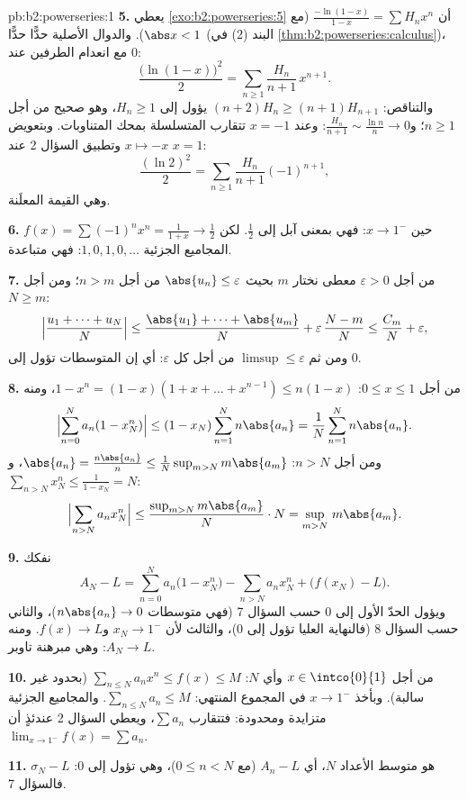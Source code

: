 \begin{solution}{pb:b2:powerseries:1}
\textbf{5.} يعطي \cref{exo:b2:powerseries:5} أن
$\frac{-\ln(1-x)}{1-x} = \sum H_nx^n$ (مع $\abs x < 1$).
والدوال الأصلية حدًّا حدًّا
(البند (2) في \cref{thm:b2:powerseries:calculus})، مع انعدام الطرفين
عند $0$:
\[
\frac{\bigl(\ln(1-x)\bigr)^2}{2}
= \sum_{n\geq1}\frac{H_n}{n+1}\,x^{n+1} .
\]
والتناقص: $(n+2)H_n \geq (n+1)H_{n+1}$ يؤول إلى $H_n \geq
1$، وهو صحيح من أجل $n \geq 1$؛ و$\frac{H_n}{n+1} \sim \frac{\ln
n}{n} \to 0$: وعند $x = -1$ تتقارب المتسلسلة بمحك
المتناوبات. وبتعويض $x \mapsto -x$ وتطبيق
السؤال 2 عند $x = 1$:
\[
\frac{(\ln 2)^2}{2}
= \sum_{n\geq1}\frac{H_n}{n+1}(-1)^{n+1},
\]
وهي القيمة المعلَنة.

\textbf{6.} $f(x) = \sum(-1)^nx^n = \frac{1}{1+x} \to \frac12$
حين $x \to 1^-$: فهي  بمعنى آبل إلى $\frac12$. لكن المجاميع
الجزئية $1, 0, 1, 0, \dots$: فهي متباعدة.

\textbf{7.} من أجل $\varepsilon > 0$ معطى نختار $m$ بحيث $\abs{u_n}
\leq \varepsilon$ من أجل $n > m$؛ ومن أجل $N \geq m$:
\[
\Bigl|\frac{u_1 + \dots + u_N}{N}\Bigr|
\leq \frac{\abs{u_1} + \dots + \abs{u_m}}{N} +
\varepsilon\,\frac{N - m}{N}
\leq \frac{C_m}{N} + \varepsilon,
\]
ومن ثم $\limsup \leq \varepsilon$ من أجل كل $\varepsilon$: أي إن
المتوسطات تؤول إلى $0$.

\textbf{8.} من أجل $0 \leq x \leq 1$: $1 - x^n = (1-x)(1 + x +
\dots + x^{n-1}) \leq n(1-x)$، ومنه
\[
\Bigl|\sum_{n=0}^N a_n(1 - x_N^n)\Bigr|
\leq (1 - x_N)\sum_{n=1}^N n\abs{a_n}
= \frac1N\sum_{n=1}^{N}n\abs{a_n} .
\]
ومن أجل $n > N$: $\abs{a_n} = \frac{n\abs{a_n}}{n} \leq
\frac{1}{N}\sup_{m>N}m\abs{a_m}$، و$\sum_{n>N}x_N^n \leq
\frac{1}{1 - x_N} = N$:
\[
\Bigl|\sum_{n>N}a_nx_N^n\Bigr|
\leq \frac{\sup_{m>N}m\abs{a_m}}{N}\cdot N
= \sup_{m>N}\,m\abs{a_m} .
\]

\textbf{9.} نفكك
\[
A_N - L = \sum_{n=0}^{N}a_n\bigl(1 - x_N^n\bigr)
- \sum_{n>N}a_nx_N^n + \bigl(f(x_N) - L\bigr) .
\]
ويؤول الحدّ الأول إلى $0$ حسب السؤال 7 (فهي متوسطات
$n\abs{a_n} \to 0$)، والثاني حسب السؤال 8 (فالنهاية العليا تؤول إلى
$0$)، والثالث لأن $x_N \to 1^-$ و$f(x) \to L$. ومنه
$A_N \to L$: وهي مبرهنة تاوبر.

\textbf{10.} من أجل $x \in \intco{0}{1}$ وأي $N$:
$\sum_{n\leq N}a_nx^n \leq f(x) \leq M$ (بحدود غير سالبة).
وبأخذ $x \to 1^-$ في المجموع المنتهي: $\sum_{n\leq N}a_n \leq M$.
والمجاميع الجزئية متزايدة ومحدودة: فتتقارب $\sum a_n$،
ويعطي السؤال 2 عندئذٍ أن $\lim_{x\to1^-}f(x) =
\sum a_n$.

\textbf{11.} $\sigma_N - L$ هو متوسط الأعداد $N$،
أي $A_n - L$ (مع $0 \leq n < N$)، وهي تؤول إلى $0$: فالسؤال 7.


\end{solution}
